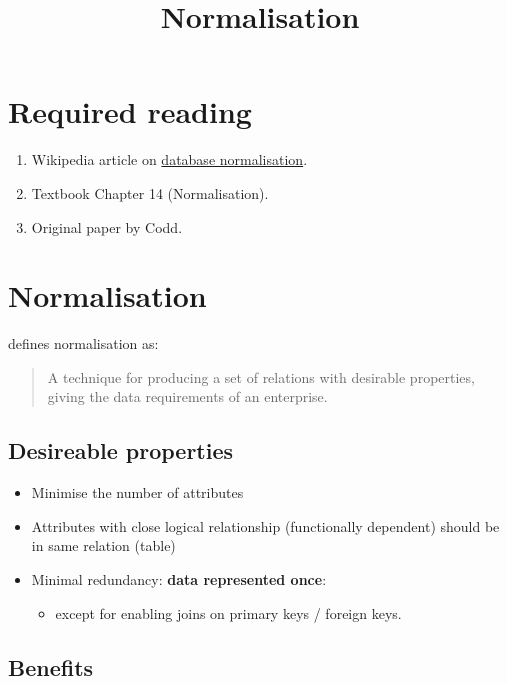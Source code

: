 \documentclass[slides]{pgnotes}
\title{Normalisation}
\begin{document}
\maketitle

\tableofcontents

\section{Required reading}\label{required-reading}

\begin{enumerate}
\item
  Wikipedia article on
  \href{https://en.wikipedia.org/wiki/Database_normalization}{database
  normalisation}.
\item
  Textbook \citep{connolly:2015:database} Chapter 14 (Normalisation).
\item
  Original paper by Codd.
\end{enumerate}

\section{Normalisation}\label{normalisation}

\citet{connolly:2015:database} defines normalisation as:

\begin{quote}
A technique for producing a set of relations with desirable properties,
giving the data requirements of an enterprise.
\end{quote}

\subsection{Desireable properties}

\begin{itemize}
\item
  Minimise the number of attributes
\item
  Attributes with close logical relationship (functionally dependent)
  should be in same relation (table)
\item
  Minimal redundancy: \textbf{data represented once}:
  \begin{itemize}
  \item  except for enabling joins on primary keys / foreign keys.
  \end{itemize}
\end{itemize}

\subsection{Benefits}
\end{document}
